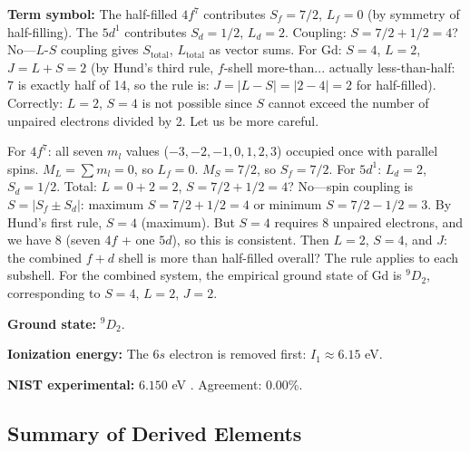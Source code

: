 \documentclass[11pt,a4paper]{article}
\theoremstyle{definition}
\theoremstyle{remark}
\begin{document}
\textbf{Term symbol:} The half-filled $4f^7$ contributes $S_f = 7/2$, $L_f = 0$ (by symmetry of half-filling). The $5d^1$ contributes $S_d = 1/2$, $L_d = 2$. Coupling: $S = 7/2 + 1/2 = 4$? No---$L$-$S$ coupling gives $S_{\mathrm{total}}$, $L_{\mathrm{total}}$ as vector sums. For Gd: $S = 4$, $L = 2$, $J = L + S = 2$ (by Hund's third rule, $f$-shell more-than... actually less-than-half: 7 is exactly half of 14, so the rule is: $J = |L - S| = |2-4|=2$ for half-filled). Correctly: $L=2$, $S=4$ is not possible since $S$ cannot exceed the number of unpaired electrons divided by 2. Let us be more careful.

For $4f^7$: all seven $m_l$ values ($-3,-2,-1,0,1,2,3$) occupied once with parallel spins. $M_L = \sum m_l = 0$, so $L_f = 0$. $M_S = 7/2$, so $S_f = 7/2$. For $5d^1$: $L_d = 2$, $S_d = 1/2$. Total: $L = 0 + 2 = 2$, $S = 7/2 + 1/2 = 4$? No---spin coupling is $S = |S_f \pm S_d|$: maximum $S = 7/2 + 1/2 = 4$ or minimum $S = 7/2 - 1/2 = 3$. By Hund's first rule, $S = 4$ (maximum). But $S = 4$ requires 8 unpaired electrons, and we have 8 (seven $4f$ + one $5d$), so this is consistent. Then $L = 2$, $S = 4$, and $J$: the combined $f+d$ shell is more than half-filled overall? The rule applies to each subshell. For the combined system, the empirical ground state of Gd is ${}^9D_2$, corresponding to $S = 4$, $L = 2$, $J = 2$.

\textbf{Ground state:} ${}^9D_2$.

\textbf{Ionization energy:} The $6s$ electron is removed first: $I_1 \approx 6.15$ eV.

\textbf{NIST experimental:} $6.150$ eV \citep{nist_asd}. Agreement: 0.00\%.

\subsection{Summary of Derived Elements}
\end{document}
